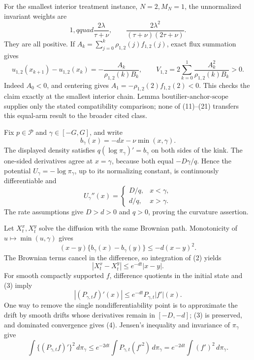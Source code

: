 For the smallest interior treatment instance, \(N=2,M_N=1\), the unnormalized invariant weights are
\[
 1,qquad \frac{2\lambda}{\tau+\nu},
 \qquad\frac{2\lambda^2}{(\tau+\nu)(2\tau+\nu)}.            \tag{20}
\]
They are all positive.  If \(A_k=\sum_{j=0}^k\rho_{1,2}(j)f_{1,2}(j)\), exact flux summation gives
\[
 u_{1,2}(x_{k+1})-u_{1,2}(x_k)
 =-\frac{A_k}{\rho_{1,2}(k)B_k},
 \qquad
 V_{1,2}=2\sum_{k=0}^1\frac{A_k^2}{\rho_{1,2}(k)B_k}>0.       \tag{21}
\]
Indeed \(A_0<0\), and centering gives \(A_1=-\rho_{1,2}(2)f_{1,2}(2)<0\).  This checks the claim exactly at the smallest interior chain.  Lemma \(\mathrm{boutilier\mbox{-}anchor\mbox{-}scope}\) supplies only the stated compatibility comparison; none of (11)--(21) transfers this equal-arm result to the broader cited class.

Fix \(p\in\mathcal P\) and \(\gamma\in[-G,G]\), and write
\[
 b_\gamma(x)=-dx-\nu\min(x,\gamma).
\]
The displayed density satisfies \(q(\log\pi_\gamma)'=b_\gamma\) on both sides of the kink.  The one-sided derivatives agree at \(x=\gamma\), because both equal \(-D\gamma/q\).  Hence the potential \(U_\gamma=-\log\pi_\gamma\), up to its normalizing constant, is continuously differentiable and
\[
 U_\gamma''(x)=
 \begin{cases}
 D/q,&x<\gamma,\\
 d/q,&x>\gamma.
 \end{cases}                                                   \tag{1}
\]
The rate assumptions give \(D>d>0\) and \(q>0\), proving the curvature assertion.

Let \(X_t^x,X_t^y\) solve the diffusion with the same Brownian path.  Monotonicity of \(u\mapsto\min(u,\gamma)\) gives
\[
 (x-y)\{b_\gamma(x)-b_\gamma(y)\}\leq-d(x-y)^2.              \tag{2}
\]
The Brownian terms cancel in the difference, so integration of (2) yields
\[
 |X_t^x-X_t^y|\leq e^{-dt}|x-y|.                              \tag{3}
\]
For smooth compactly supported \(f\), difference quotients in the initial state and (3) imply
\[
 |(P_{\gamma,t}f)'(x)|
 \leq e^{-dt}P_{\gamma,t}|f'|(x).                             \tag{4}
\]
One way to remove the single nondifferentiability point is to approximate the drift by smooth drifts whose derivatives remain in \([-D,-d]\); (3) is preserved, and dominated convergence gives (4).  Jensen's inequality and invariance of \(\pi_\gamma\) give
\[
 \int\{(P_{\gamma,t}f)'\}^2\,d\pi_\gamma
 \leq e^{-2dt}\int P_{\gamma,t}(f'^2)\,d\pi_\gamma
 =e^{-2dt}\int(f')^2\,d\pi_\gamma.                           \tag{5}
\]

